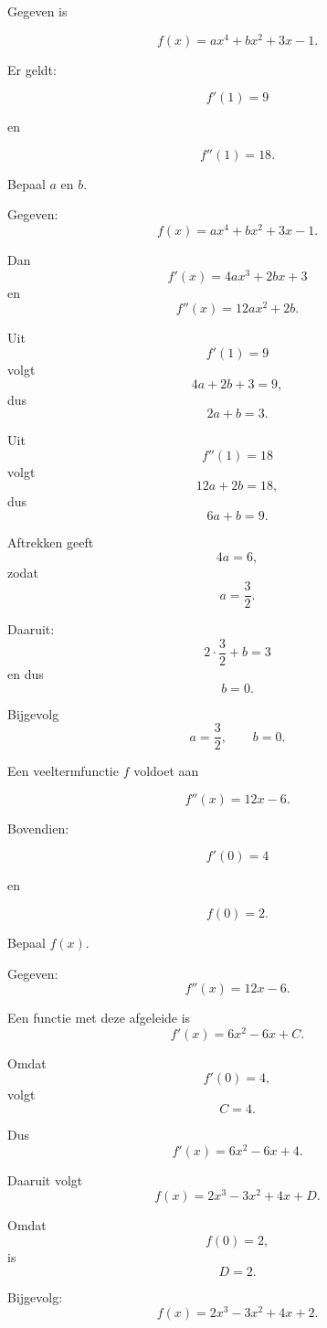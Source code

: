 \documentclass{ximera}
\begin{document}
\begin{oefening}{\oefG}

Gegeven is

\[
f(x)=ax^4+bx^2+3x-1.
\]

Er geldt:

\[
f'(1)=9
\]

en

\[
f''(1)=18.
\]

Bepaal $a$ en $b$.

\begin{oplossing}

Gegeven:
\[
f(x)=ax^4+bx^2+3x-1.
\]

Dan
\[
f'(x)=4ax^3+2bx+3
\]
en
\[
f''(x)=12ax^2+2b.
\]

Uit
\[
f'(1)=9
\]
volgt
\[
4a+2b+3=9,
\]
dus
\[
2a+b=3.
\]

Uit
\[
f''(1)=18
\]
volgt
\[
12a+2b=18,
\]
dus
\[
6a+b=9.
\]

Aftrekken geeft
\[
4a=6,
\]
zodat
\[
a=\frac32.
\]

Daaruit:
\[
2\cdot\frac32+b=3
\]
en dus
\[
b=0.
\]

Bijgevolg
\[
\boxed{a=\frac32,\qquad b=0}.
\]

\end{oplossing}

\end{oefening}



\begin{oefening}{\oefG}

Een veeltermfunctie $f$ voldoet aan

\[
f''(x)=12x-6.
\]

Bovendien:

\[
f'(0)=4
\]

en

\[
f(0)=2.
\]

Bepaal $f(x)$.

\begin{oplossing}

Gegeven:
\[
f''(x)=12x-6.
\]

Een functie met deze afgeleide is
\[
f'(x)=6x^2-6x+C.
\]

Omdat
\[
f'(0)=4,
\]
volgt
\[
C=4.
\]

Dus
\[
f'(x)=6x^2-6x+4.
\]

Daaruit volgt
\[
f(x)=2x^3-3x^2+4x+D.
\]

Omdat
\[
f(0)=2,
\]
is
\[
D=2.
\]

Bijgevolg:
\[
\boxed{f(x)=2x^3-3x^2+4x+2}.
\]

\end{oplossing}

\end{oefening}
\end{document}
